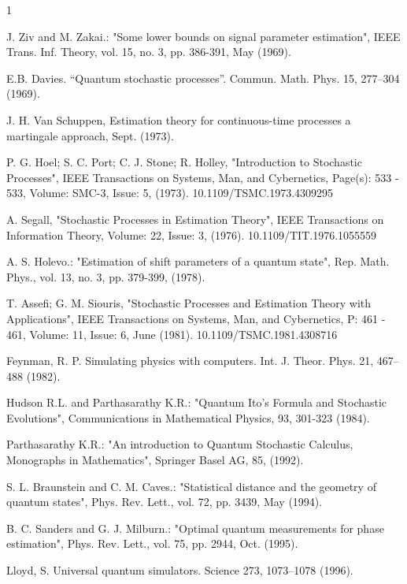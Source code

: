 \documentclass[journal,twocolumn]{IEEEtran}
\begin{document}
\begin{thebibliography}{1}



J. Ziv and M. Zakai.: "Some lower bounds on signal parameter estimation", IEEE Trans. Inf. Theory, vol. 15, no. 3, pp. 386-391, May (1969).

E.B. Davies. “Quantum stochastic processes”. Commun. Math. Phys. 15, 277–304 (1969).

J. H. Van Schuppen, Estimation theory for continuous-time processes a martingale approach, Sept. (1973).

P. G. Hoel; S. C. Port; C. J. Stone; R. Holley, "Introduction to Stochastic Processes", IEEE Transactions on Systems, Man, and Cybernetics, Page(s): 533 - 533, Volume: SMC-3, Issue: 5, (1973). 10.1109/TSMC.1973.4309295

A. Segall, "Stochastic Processes in Estimation Theory",  IEEE Transactions on Information Theory, Volume: 22, Issue: 3, (1976). 10.1109/TIT.1976.1055559

A. S. Holevo.: "Estimation of shift parameters of a quantum state", Rep. Math. Phys., vol. 13, no. 3, pp. 379-399, (1978).

T. Assefi; G. M. Siouris, "Stochastic Processes and Estimation Theory with Applications", IEEE Transactions on Systems, Man, and Cybernetics, P: 461 - 461, Volume: 11, Issue: 6, June (1981). 10.1109/TSMC.1981.4308716

Feynman, R. P. Simulating physics with computers. Int. J. Theor. Phys. 21, 467–488 (1982).

Hudson R.L. and Parthasarathy K.R.: "Quantum Ito's Formula and Stochastic Evolutions", Communications in Mathematical Physics, 93, 301-323 (1984).

Parthasarathy K.R.: "An introduction to Quantum Stochastic Calculus, Monographs in Mathematics", Springer Basel AG, 85, (1992).

S. L. Braunstein and C. M. Caves.: "Statistical distance and the geometry of quantum states", Phys. Rev. Lett., vol. 72, pp. 3439, May (1994).

B. C. Sanders and G. J. Milburn.: "Optimal quantum measurements for phase estimation", Phys. Rev. Lett., vol. 75, pp. 2944, Oct. (1995).

Lloyd, S. Universal quantum simulators. Science 273, 1073–1078 (1996).


\end{thebibliography}
\end{document}
